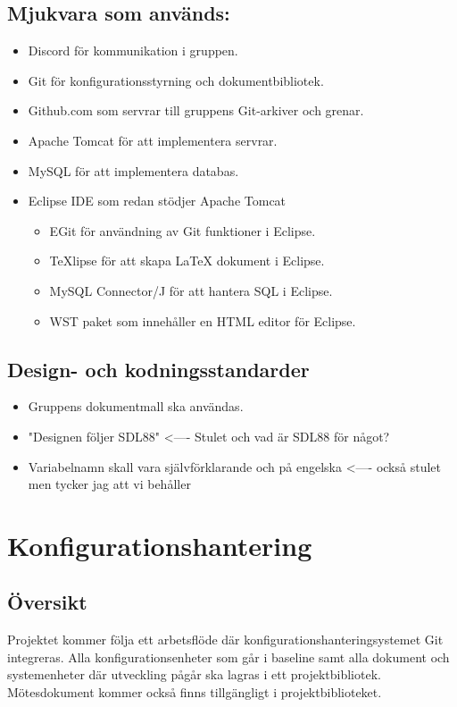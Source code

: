 \documentclass[paper=a4, fontsize=11pt,twoside]{article}
\begin{document}
\subsection*{Mjukvara som används:}
	\begin{itemize}
	\item Discord för kommunikation i gruppen.
	\item Git för konfigurationsstyrning och dokumentbibliotek.
	\item Github.com som servrar till gruppens Git-arkiver och grenar.
	\item Apache Tomcat för att implementera servrar.
	\item MySQL för att implementera databas.
	\item Eclipse IDE som redan stödjer Apache Tomcat
		\begin{itemize}
		\item EGit för användning av Git funktioner i Eclipse.
		\item TeXlipse för att skapa LaTeX dokument i Eclipse.
		\item MySQL Connector/J för att hantera SQL i Eclipse.
		\item WST paket som innehåller en HTML editor för Eclipse. 
		\end{itemize}
	\end{itemize}

\subsection*{Design- och kodningsstandarder}
	\begin{itemize}
	\item Gruppens dokumentmall ska användas.
	\item "Designen följer SDL88" <---- Stulet och vad är SDL88 för något?
	\item Variabelnamn skall vara självförklarande och på engelska <---- också stulet men tycker jag att vi behåller
\end{itemize}



\section{Konfigurationshantering}
\subsection*{Översikt}
Projektet kommer följa ett arbetsflöde där konfigurationshanteringsystemet Git
integreras. Alla konfigurationsenheter som går i baseline samt alla dokument och systemenheter där utveckling pågår ska lagras i ett projektbibliotek. Mötesdokument kommer också finns tillgängligt i projektbiblioteket.
 
\end{document}
